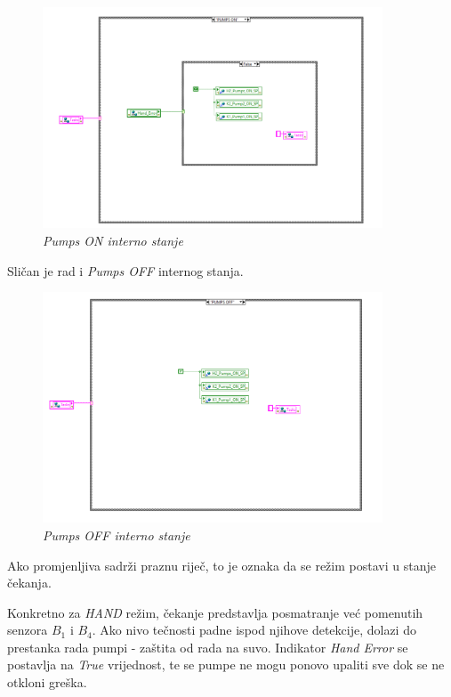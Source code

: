 \documentclass[12pt, titlepage]{article}
\begin{document}
                \begin{figure}[ht]
                    \centering
                    \includegraphics[width=0.9\textwidth]{Slike/HAND_AUTO.vi PUMPS ON.png}
                    \caption{\textit{Pumps ON interno stanje}}
                \end{figure}

                Sličan je rad i \textit{Pumps OFF} internog stanja.

                \begin{figure}[ht]
                    \centering
                    \includegraphics[width=0.9\textwidth]{Slike/HAND_AUTO.vi PUMPS OFF.png}
                    \caption{\textit{Pumps OFF interno stanje}}
                \end{figure}

                Ako promjenljiva sadrži praznu riječ, to je oznaka da se režim postavi u stanje čekanja.
                
                Konkretno za \textit{HAND} režim, čekanje predstavlja posmatranje već pomenutih 
                senzora $B_1$ i $B_4$. Ako nivo tečnosti padne ispod njihove detekcije, dolazi do 
                prestanka rada pumpi - zaštita od rada na suvo. Indikator \textit{Hand Error} se postavlja
                na \textit{True} vrijednost, te se pumpe ne mogu ponovo upaliti sve dok se ne otkloni
                greška.
\end{document}
